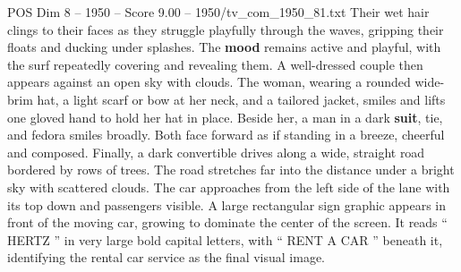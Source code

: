 \begin{textsample}{POS Dim 8 – 1950 – Score 9.00 – 1950/tv\_com\_1950\_81.txt}
Their wet hair clings to their faces as they struggle playfully through the waves, gripping their floats and ducking under splashes.
The \textbf{mood} remains active and playful, with the surf repeatedly covering and revealing them.
A well-dressed couple then appears against an open sky with clouds.
The woman, wearing a rounded wide-brim hat, a light scarf or bow at her neck, and a tailored jacket, smiles and lifts one gloved hand to hold her hat in place.
Beside her, a man in a dark \textbf{suit}, tie, and fedora smiles broadly.
Both face forward as if standing in a breeze, cheerful and composed.
Finally, a dark convertible drives along a wide, straight road bordered by rows of trees.
The road stretches far into the distance under a bright sky with scattered clouds.
The car approaches from the left side of the lane with its top down and passengers visible.
A large rectangular sign graphic appears in front of the moving car, growing to dominate the center of the screen.
It reads “ HERTZ ” in very large bold capital letters, with “ RENT A CAR ” beneath it, identifying the rental car service as the final visual image.

\end{textsample}
